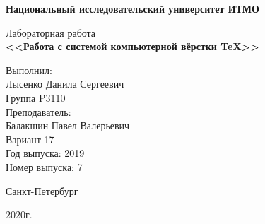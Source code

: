 \thispagestyle{empty}
\begin{center}
    {\bfseries Национальный исследовательский университет ИТМО}\\

    \vspace{20em}

    {\Large Лабораторная работа }\\
    {\Large \textbf{<<Работа с системой компьютерной вёрстки \TeX>>}}
\end{center}

\vspace{15em}

\begin{flushright}
    Выполнил:\\
    Лысенко Данила Сергеевич\\
    Группа P3110\\
    Преподаватель:\\
    Балакшин Павел Валерьевич\\
    Вариант 17\\
    Год выпуска: 2019\\
    Номер выпуска: 7
\end{flushright}

\vspace{\fill}

\begin{center}
Санкт-Петербург

2020г.
\end{center}